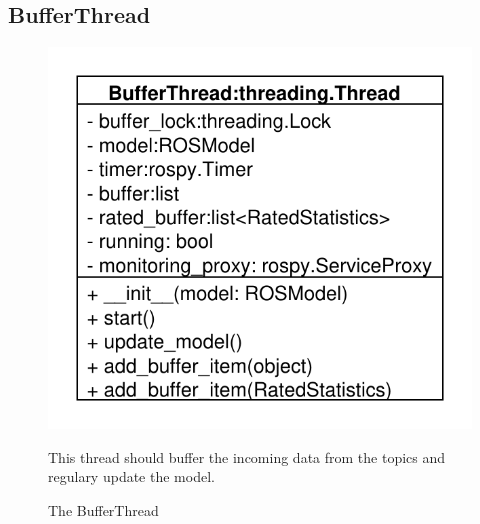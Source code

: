 \subsection{BufferThread}
\begin{figure}[htbp]
	\begin{minipage}[t]{7cm}
		\vspace{0pt}
		\centering
		\includegraphics[scale=0.6]{./diagram_pictures/BufferThread.pdf}
		\caption{The BufferThread}
	\end{minipage}
	\hfill
	\begin{minipage}[t]{8cm}
		\vspace{10pt}
		This thread should buffer the incoming data from the topics and regulary
		update the model.
	\end{minipage}
\end{figure}
